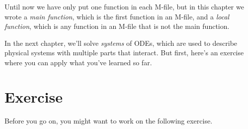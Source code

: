 Until now we have only put one function in each M-file, but in this chapter we wrote a \emph{main function}, which is the first function in an M-file, and a \emph{local function}, which is any function in an M-file that is not the main function.

In the next chapter, we'll solve \emph{systems} of ODEs, which are used to describe physical systems with multiple parts that interact.
But first, here's an exercise where you can apply what you've learned so far.


\section{Exercise}

Before you go on, you might want to work on the following exercise.

